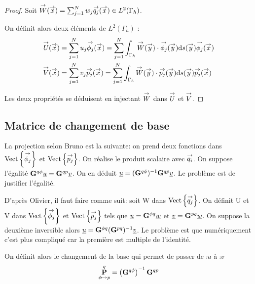     \begin{proof}
      Soit  \(\vect{W}(\vx) = \sum_{j=1}^N w_j \qj(\vx) \in L^2(\Gamma_h)\).

      On définit alors deux éléments de \(L^2(\Gamma_h)\) :
      \begin{align}
        \vect{U}(\vx) &= \sum_{j=1}^N u_j \phij(\vx) = \sum_{j=1}^N \int_{\Gamma_h}\vect{W}(\vy)\cdot\phij(\vy)\dd{s}(\vy) \phij(\vx  )
        \\
        \vect{V}(\vx) &= \sum_{j=1}^N v_j \pj(\vx) = \sum_{j=1}^N \int_{\Gamma_h}\vect{W}(\vy)\cdot\pj(\vy)\dd{s}(\vy) \pj(\vx)
      \end{align}

      Les deux propriétés se déduisent en injectant \(\vect{W}\) dans \(\vect{U}\) et \(\vect{V}\).
    \end{proof}




  \subsection{Matrice de changement de base}

    \begin{TODO}
      La projection selon Bruno est la suivante: on prend deux fonctions dans \(\Vect{\phij}\) et \(\Vect{\pj}\). On réalise le produit scalaire avec \(\vect{q_i}\). On suppose l'égalité \(\mG{q}{\phi}\comp{u} = \mG{q}{p}\comp{v}\). On en déduit \(\comp{u} = (\mG{q}{\phi})^{-1} \mG{q}{p} \comp{v} \). Le problème est de justifier l'égalité.

      D'après Olivier, il faut faire comme suit: soit W dans \(\Vect{\qj}\). 
      On définit U et V dans \(\Vect{\phij}\) et \(\Vect{\pj}\) tels que \(\comp{u}=\mG{\phi}{q}\comp{w}\) et  \(\comp{v}=\mG{p}{q}\comp{w}\).
      On suppose la deuxième inversible alors  \(\comp{u} =\mG{\phi}{q} (\mG{p}{q})^{-1} \comp{v} \). Le problème est que numériquement c'est plus compliqué car la première est multiple de l'identité.



    \end{TODO}

    \begin{defn}
      On définit alors le changement de la base qui permet de passer de \(\comp{u}\) à \(\comp{v}\)
      \begin{equation*}
        \mP{\phi}{p}{q} = \left(\mG{q}{\phi}\right)^{-1}\mG{q}{p}
      \end{equation*}
    \end{defn}

